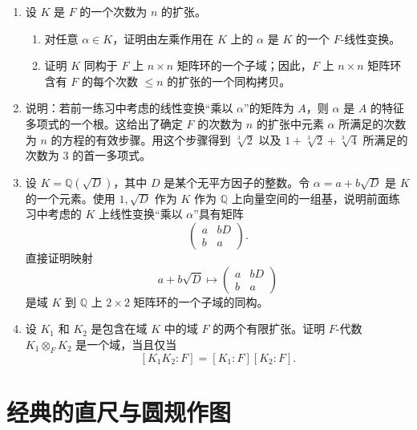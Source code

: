 \begin{enumerate}[label=\arabic*.]
	\item 设 $K$ 是 $F$ 的一个次数为 $n$ 的扩张。
	\begin{enumerate}[label=(\alph*)]
		\item 对任意 $\alpha\in K$，证明由左乘作用在 $K$ 上的 $\alpha$ 是 $K$ 的一个 $F$-线性变换。
		\item 证明 $K$ 同构于 $F$ 上 $n\times n$ 矩阵环的一个子域；因此，$F$ 上 $n\times n$ 矩阵环含有 $F$ 的每个次数 $\leq n$ 的扩张的一个同构拷贝。
	\end{enumerate}
	
	\item 说明：若前一练习中考虑的线性变换“乘以 $\alpha$”的矩阵为 $A$，则 $\alpha$ 是 $A$ 的特征多项式的一个根。这给出了确定 $F$ 的次数为 $n$ 的扩张中元素 $\alpha$ 所满足的次数为 $n$ 的方程的有效步骤。用这个步骤得到 $\sqrt[3]{2}$ 以及 $1+\sqrt[3]{2}+\sqrt[3]{4}$ 所满足的次数为 $3$ 的首一多项式。
	
	\item 设 $K=\mathbb Q(\sqrt D)$，其中 $D$ 是某个无平方因子的整数。令 $\alpha=a+b\sqrt D$ 是 $K$ 的一个元素。使用 $1,\sqrt D$ 作为 $K$ 作为 $\mathbb Q$ 上向量空间的一组基，说明前面练习中考虑的 $K$ 上线性变换“乘以 $\alpha$”具有矩阵
	\[
	\begin{pmatrix}
		a & bD\\
		b & a
	\end{pmatrix}.
	\]
	直接证明映射
	\[
	a+b\sqrt D\longmapsto
	\begin{pmatrix}
		a & bD\\
		b & a
	\end{pmatrix}
	\]
	是域 $K$ 到 $\mathbb Q$ 上 $2\times2$ 矩阵环的一个子域的同构。
	
	\item 设 $K_1$ 和 $K_2$ 是包含在域 $K$ 中的域 $F$ 的两个有限扩张。证明 $F$-代数 $K_1\otimes_F K_2$ 是一个域，当且仅当
	\[
	[K_1K_2:F]=[K_1:F][K_2:F].
	\]
\end{enumerate}
\section{经典的直尺与圆规作图}

